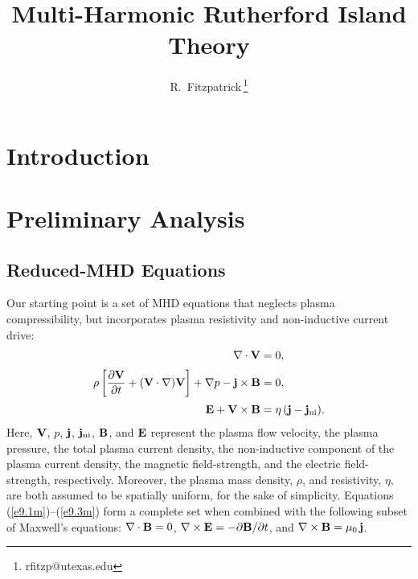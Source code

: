 \documentclass[12pt,prb,aps]{revtex4-1}
\begin{document}
\title{Multi-Harmonic Rutherford Island Theory}

\author{R.~Fitzpatrick\,\footnote{rfitzp@utexas.edu}}

\begin{abstract}
\end{abstract}

\maketitle

\section{Introduction}

\section{Preliminary Analysis}
\subsection{Reduced-MHD Equations}
Our starting point is a set of MHD equations that neglects plasma compressibility,
but incorporates  plasma resistivity and non-inductive current drive: 
\begin{align}
\nabla\cdot{\bf V} &= 0,\label{e9.1m}\\[0.5ex]
\rho\left[\frac{\partial {\bf V}}{\partial t} + ({\bf V}\cdot\nabla) {\bf V}\right]+\nabla p-{\bf j}\times {\bf B} &=0,\label{e9.2m}\\[0,5ex]
{\bf E} + {\bf V} \times {\bf B} &=\eta\,({\bf j}-{\bf j}_{\rm ni}).\label{e9.3m}
\end{align}
Here, ${\bf V}$, $p$,   ${\bf j}$, ${\bf j}_{\rm ni}$, ${\bf B}$,  and ${\bf E}$  represent the plasma flow velocity, the plasma
pressure, the total plasma current density, 
the non-inductive component of the plasma current density, the magnetic field-strength, and the electric field-strength, respectively.  Moreover, the plasma mass density, $\rho$, and resistivity, $\eta$, are both assumed to be spatially uniform, for the sake of simplicity.  
Equations (\ref{e9.1m})--(\ref{e9.3m})  form a complete set when combined with the following subset of 
Maxwell's equations:
$\nabla\cdot{\bf B} =0$,
$ \nabla\times {\bf E}=-\partial{\bf B}/\partial t$, and $\nabla\times {\bf B} = \mu_0\,{\bf j}$.
 
\end{document}
